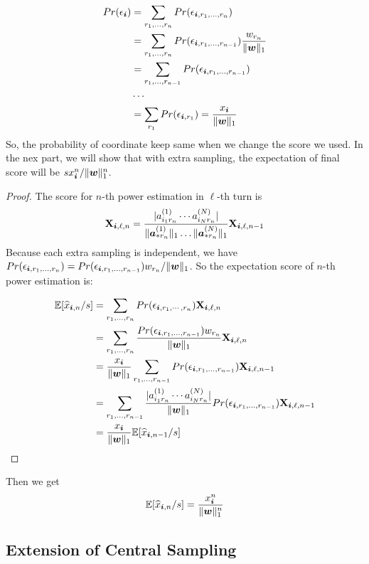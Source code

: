\documentclass[letterpaper]{article}
\newcommand{\Sca}[3]{{#1}^{(#2)}_{i_#2#3}}%
\newcommand{\V}[1]{{\bm{{\MakeLowercase{#1}}}}}
\newcommand{\VnC}[3]{\V{#1}^{(#2)}_{#3}}
\newcommand{\Nrocl}[2]{\norm{\VnC{a}{#1}{*#2}}{1}}
\newcommand{\M}[1]{{\bm{\mathbf{\MakeUppercase{#1}}}}}
\newcommand{\norm}[2]{\|#1\|_{#2}}
\begin{document}
\begin{align*}
Pr(\epsilon_{\V{i}}) &= \sum_{r_1,\ldots,r_n}Pr(\epsilon_{\V{i},r_1,\ldots,r_n})\\
&= \sum_{r_1,\ldots,r_n}Pr(\epsilon_{\V{i},r_1,\ldots,r_{n-1}})\frac{w_{r_n}}{\norm{\V{w}}{1}}\\
&= \sum_{r_1,\ldots,r_{n-1}}Pr(\epsilon_{\V{i},r_1,\ldots,r_{n-1}})\\
& \cdots\\
&= \sum_{r_1}Pr(\epsilon_{\V{i},r_1})= \frac{x_{\V{i}}}{\norm{\V{w}}{1}}
\end{align*}
So, the probability of coordinate keep same when we change the score we used.
In the nex part, we will show that with extra sampling, the expectation of final score will be $sx_{\V{i}}^n/\norm{\V{w}}{1}^n$.
\begin{proof}
The score for $n$-th power estimation in $\ell$-th turn is
\[
\M{X}_{\V{i},\ell,n}  = \frac{|\Sca{a}{1}{r_n}\cdots\Sca{a}{N}{r_n}|}{\Nrocl{1}{r_n}\ldots\Nrocl{N}{r_n}}
\M{X}_{\V{i},\ell,n-1}
\]
Because each extra sampling is independent, we have $Pr(\epsilon_{\V{i},r_1,\ldots,r_n})=Pr(\epsilon_{\V{i},r_1,\ldots,r_{n-1}})w_{r_n}/\norm{\V{w}}{1}$. So the expectation score of $n$-th power estimation is:

\begin{align*}
\mathbb{E}[\widehat{x}_{\V{i},n}/s]
& = \sum_{r_1,\ldots,r_n}Pr(\epsilon_{\V{i},r_1,\cdots,r_n})\M{X}_{\V{i},\ell,n}\\
& = \sum_{r_1,\ldots,r_n}
\frac{Pr(\epsilon_{\V{i},r_1,\ldots,r_{n-1}})w_{r_n}}{\norm{\V{w}}{1}}\M{X}_{\V{i},\ell,n}\\
& = \frac{x_{\V{i}}}{\norm{\V{w}}{1}}\sum_{r_1,\ldots,r_{n-1}}
Pr(\epsilon_{\V{i},r_1,\ldots,r_{n-1}})\M{X}_{\V{i},\ell,n-1}\\
& = \sum_{r_1,\ldots,r_{n-1}}
\frac{|\Sca{a}{1}{r_n}\cdots\Sca{a}{N}{r_n}|}{\norm{\V{w}}{1}}
Pr(\epsilon_{\V{i},r_1,\ldots,r_{n-1}})\M{X}_{\V{i},\ell,n-1}\\
& = \frac{x_{\V{i}}}{\norm{\V{w}}{1}}\mathbb{E}[\widehat{x}_{\V{i},n-1}/s]
\end{align*}
\end{proof}
Then we get
\begin{equation}
\mathbb{E}[\widehat{x}_{\V{i},n}/s] = \frac{x^n_{\V{i}}}{\norm{\V{w}}{1}^n}
\end{equation}

\subsection{Extension of Central Sampling}
\end{document}
